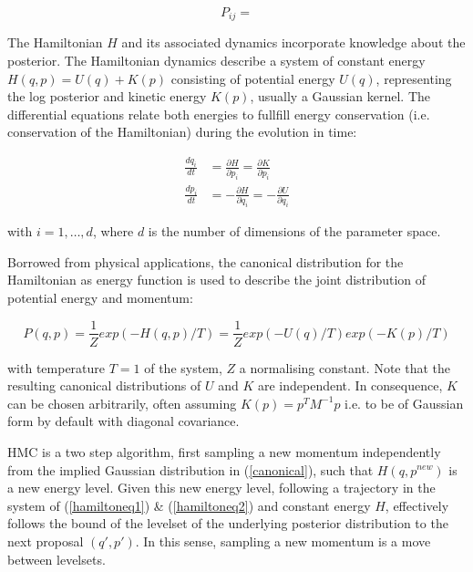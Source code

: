 \documentclass[11pt]{article}
\begin{document}
        \begin{equation}
            P_{ij} =
        \end{equation} %

        The Hamiltonian $H$ and its associated dynamics incorporate knowledge about the posterior. The Hamiltonian dynamics describe a system of constant energy $H(q,p) = U(q) + K(p)$ consisting of potential energy $U(q)$, representing the log posterior and kinetic energy $K(p)$, usually a Gaussian kernel. The differential equations relate both energies to fullfill energy conservation (i.e. conservation of the Hamiltonian) during the evolution in time:

        \begin{align}
            \frac{dq_i}{dt} &= \frac{\partial H}{\partial p_i} =  \frac{\partial K}{\partial p_i} \label{hamiltoneq1} \\
            \frac{dp_i}{dt} &= -\frac{\partial H}{\partial q_i} = -\frac{\partial U}{\partial q_i}  \label{hamiltoneq2}
        \end{align}

        with $i = 1, \dots, d$, where $d$ is the number of dimensions of the parameter space.

        Borrowed from physical applications, the canonical distribution for the Hamiltonian as energy function is used to describe the joint distribution of potential energy and momentum:

        \begin{equation}\label{canonical}
            P(q,p) = \frac{1}{Z}exp(-H(q,p)/T) = \frac{1}{Z}exp(-U(q)/T)exp(-K(p)/T)
        \end{equation}

        with temperature $T=1$ of the system, $Z$ a normalising constant. Note that the resulting canonical distributions of $U$ and $K$ are independent. In consequence, $K$ can be chosen arbitrarily, often assuming $K(p) = p^TM^{-1}p$ i.e. to be of Gaussian form by default with diagonal covariance. %

        HMC is a two step algorithm, first sampling a new momentum independently from the implied Gaussian distribution in (\ref{canonical}), such that $H(q, p^{new})$ is a new energy level. Given this new energy level, following a trajectory in the system of (\ref{hamiltoneq1}) \& (\ref{hamiltoneq2}) and constant energy $H$, effectively follows the bound of the levelset of the underlying posterior distribution to the next proposal $(q', p')$. In this sense, sampling a new momentum is a move between levelsets. %
\end{document}
